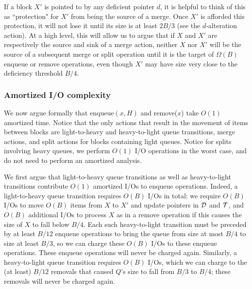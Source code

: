 \documentclass[11pt,letterpaper]{article}
\newcommand{\eat}[1]{}
\begin{document}
If a block $X'$ is pointed to by any deficient pointer $d$, it is helpful to think of this 
as ``protection" for $X'$ from being the source of a merge. Once $X'$ is afforded this protection,
it will not lose it until its size is at least $2B/3$ (see the $d$-alteration action).
At a high level, this will allow us to argue that if $X$ and $X'$ are respectively 
the source and sink of a merge action,
neither $X$ nor $X'$ will be the source of a subsequent merge or split operation until it is the target of $\Omega(B)$ enqueue
or remove operations, even though $X'$ may have size very close to the deficiency threshold $B/4$. 

\subsubsection{Amortized I/O complexity}
\label{sec:amort}
\eat{In total this costs $O(B)$ I/Os, but we can charge these,
in an amortized sense, to the $O(B)$
enqueue operations that caused 
$X$ to grow from size at most $2B/3$ to at least $B$.
(These enqueue operations will never be charged in this way again.)}

We now argue formally that enqueue$(x, H)$ and remove($x$) take $O(1)$ amortized time. Notice that the only actions that result in the movement of items between blocks are light-to-heavy and heavy-to-light queue transitions, merge actions, and split actions for blocks containing light queues. Notice for splits involving heavy queues, we perform $O(1)$ I/O operations 
in the worst case,
and do not need to perform an amortized analysis.  

We first argue that light-to-heavy queue transitions as well as heavy-to-light transitions contribute $O(1)$ amortized I/Os to enqueue operations. Indeed, a light-to-heavy queue transition
requires $O(B)$ I/Os in total: we require $O(B)$ I/Os to move $O(B)$ items from $X$ to $X'$ and update pointers in $\cal D$ and $\cal T$, and $O(B)$ additional I/Os to process $X$ as in a remove operation if this causes the size of $X$ to fall below $B/4$. Each such heavy-to-light transition
must be preceded by at least $B/12$ enqueue operations to bring the queue from size at most $B/4$ to size at least $B/3$, so we can charge these $O(B)$ I/Os to these enqueue operations. These enqueue operations will never be charged again. Similarly, a heavy-to-light queue transition requires $O(B)$ I/Os, which we can charge to the (at least) $B/12$ removals that caused $Q$'s size
to fall from $B/3$ to $B/4$; these removals will never be charged again.
\end{document}
